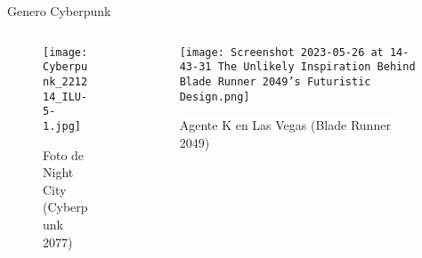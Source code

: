 \documentclass[aspectratio = 1609]{beamer}
\title{\centering{\texttt{[image: cyberpunk.png]}}}
\author{Ignacio Morales Mi}
\date{Junio 2023}
\begin{document}
\maketitle


\begin{frame}{Genero Cyberpunk}

\begin{columns}
        \begin{column}{.5\textwidth}
        \begin{figure}
        \texttt{[image: Cyberpunk\_221214\_ILU-5-1.jpg]}
        \caption{Foto de Night City (Cyberpunk 2077)}
        \end{figure}
        \end{column}
        \begin{column}{.5\textwidth}
        \begin{figure}
        \texttt{[image: Screenshot 2023-05-26 at 14-43-31 The Unlikely Inspiration Behind Blade Runner 2049’s Futuristic Design.png]}
        \caption{\colorbox{white}{Agente K en Las Vegas (Blade Runner 2049)}}
        \end{figure}    
        \end{column}
\end{columns}
\end{frame}
\end{document}
